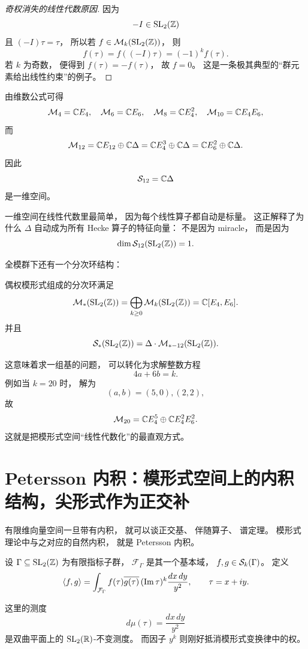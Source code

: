 \begin{proof}[奇权消失的线性代数原因] 因为 \[ -I\in \mathrm{SL}_2(\mathbb{Z}) \] 且 $(-I)\tau=\tau$， 所以若 $f\in\mathcal{M}_k(\mathrm{SL}_2(\mathbb{Z}))$， 则 \[ f(\tau)=f((-I)\tau)=(-1)^k f(\tau). \] 若 $k$ 为奇数， 便得到 $f(\tau)=-f(\tau)$， 故 $f=0$。 这是一条极其典型的“群元素给出线性约束”的例子。 \end{proof}




\begin{example}[小权空间] 由维数公式可得 \[ \mathcal{M}_4=\mathbb{C} E_4,\quad \mathcal{M}_6=\mathbb{C} E_6,\quad \mathcal{M}_8=\mathbb{C} E_4^2,\quad \mathcal{M}_{10}=\mathbb{C} E_4E_6, \] 而 \[ \mathcal{M}_{12}=\mathbb{C} E_{12}\oplus \mathbb{C}\Delta =\mathbb{C} E_4^3\oplus \mathbb{C}\Delta =\mathbb{C} E_6^2\oplus \mathbb{C}\Delta. \] 因此 \[ \mathcal{S}_{12}=\mathbb{C}\Delta \] 是一维空间。 \end{example}




\begin{remark} 一维空间在线性代数里最简单， 因为每个线性算子都自动是标量。 这正解释了为什么 $\Delta$ 自动成为所有 Hecke 算子的特征向量： 不是因为 miracle， 而是因为 \[ \dim \mathcal{S}_{12}(\mathrm{SL}_2(\mathbb{Z}))=1. \] \end{remark} 全模群下还有一个分次环结构：




\begin{proposition} 偶权模形式组成的分次环满足 \[ \mathcal{M}_*(\mathrm{SL}_2(\mathbb{Z})) = \bigoplus_{k\ge0}\mathcal{M}_k(\mathrm{SL}_2(\mathbb{Z})) = \mathbb{C}[E_4,E_6]. \] 并且 \[ \mathcal{S}_*(\mathrm{SL}_2(\mathbb{Z}))=\Delta\cdot \mathcal{M}_{*-12}(\mathrm{SL}_2(\mathbb{Z})). \] \end{proposition} 这意味着求一组基的问题， 可以转化为求解整数方程 \[ 4a+6b=k. \] 例如当 $k=20$ 时， 解为 \[ (a,b)=(5,0),(2,2), \] 故 \[ \mathcal{M}_{20}=\mathbb{C} E_4^5\oplus \mathbb{C} E_4^2E_6^2. \] 这就是把模形式空间“线性代数化”的最直观方式。




\section{Petersson 内积：模形式空间上的内积结构，尖形式作为正交补}




有限维向量空间一旦带有内积， 就可以谈正交基、 伴随算子、 谱定理。 模形式理论中与之对应的自然内积， 就是 Petersson 内积。




\begin{definition}[Petersson 内积] 设 $\Gamma\subseteq \mathrm{SL}_2(\mathbb{Z})$ 为有限指标子群， $\mathcal F_\Gamma$ 是其一个基本域， $f,g\in \mathcal{S}_k(\Gamma)$。 定义 \[ \langle f, g \rangle = \int_{\mathcal F_\Gamma} f(\tau)\overline{g(\tau)}\,(\mathrm{Im}\,\tau)^k \frac{dx\,dy}{y^2}, \qquad \tau=x+iy. \] \end{definition} 这里的测度 \[ d\mu(\tau)=\frac{dx\,dy}{y^2} \] 是双曲平面上的 $\mathrm{SL}_2(\mathbb{R})$-不变测度。 而因子 $y^k$ 则刚好抵消模形式变换律中的权。




